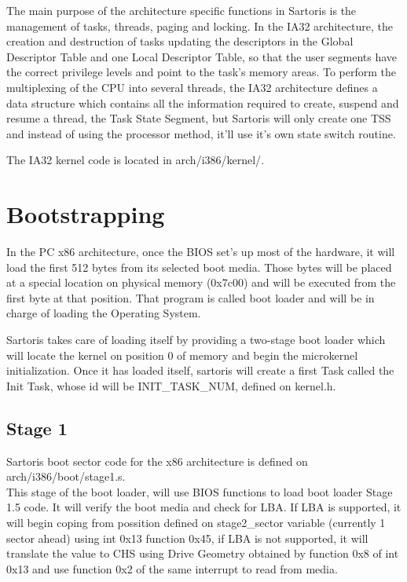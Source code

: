 \documentclass[11pt, letterpaper, twoside, english]{book}
\begin{document}
The main purpose of the architecture specific functions in Sartoris is the management of tasks, threads, paging and locking. In the IA32 architecture, the creation and destruction of tasks updating the descriptors in the Global Descriptor Table and one Local Descriptor Table, so that the user segments have the correct privilege levels and point to the task's memory areas. To perform the multiplexing of the CPU into several threads, the IA32 architecture defines a data structure which contains all the information required to create, suspend and resume a thread, the Task State Segment, but Sartoris will only create one TSS and instead of using the processor method, it'll use it's own state switch routine.

The IA32 kernel code is located in \textsf{arch/i386/kernel/}.

\section{Bootstrapping}

In the PC x86 architecture, once the BIOS set's up most of the hardware, it will load the first 512 bytes from its selected boot media. Those bytes will be placed at a special location on physical memory (0x7c00) and will be executed from the first byte at that position. That program is called boot loader and will be in charge of loading the Operating System.

Sartoris takes care of loading itself by providing a two-stage boot loader which will locate the kernel on position 0 of memory and begin the microkernel initialization. Once it has loaded itself, sartoris will create a first Task called the Init Task, whose id will be \textsf{INIT\_TASK\_NUM}, defined on kernel.h. 

\subsection{Stage 1}

Sartoris boot sector code for the x86 architecture is defined on arch/i386/boot/stage1.s.\\

This stage of the boot loader, will use BIOS functions to load boot loader Stage 1.5 code. It will verify the boot media and check for LBA. If LBA is supported, it will begin coping from possition defined on stage2\_sector variable (currently 1 sector ahead) using int 0x13 function 0x45, if LBA is not supported, it will translate the value to CHS using Drive Geometry obtained by function 0x8 of int 0x13 and use function 0x2 of the same interrupt to read from media.\\
\end{document}
